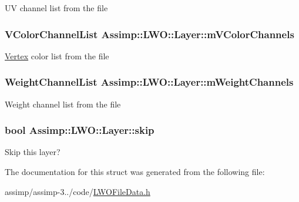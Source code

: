 U\+V channel list from the file \hypertarget{struct_assimp_1_1_l_w_o_1_1_layer_a641f7d01eea957b1f4fa9e272ae95679}{
\subsubsection[{m\+V\+Color\+Channels}]{\setlength{\rightskip}{0pt plus 5cm}V\+Color\+Channel\+List Assimp\+::\+L\+W\+O\+::\+Layer\+::m\+V\+Color\+Channels}}\label{struct_assimp_1_1_l_w_o_1_1_layer_a641f7d01eea957b1f4fa9e272ae95679}
\hyperlink{class_assimp_1_1_vertex}{Vertex} color list from the file \hypertarget{struct_assimp_1_1_l_w_o_1_1_layer_ab23b1fad6b5684399a082c6ffce1eee8}{
\subsubsection[{m\+Weight\+Channels}]{\setlength{\rightskip}{0pt plus 5cm}Weight\+Channel\+List Assimp\+::\+L\+W\+O\+::\+Layer\+::m\+Weight\+Channels}}\label{struct_assimp_1_1_l_w_o_1_1_layer_ab23b1fad6b5684399a082c6ffce1eee8}
Weight channel list from the file \hypertarget{struct_assimp_1_1_l_w_o_1_1_layer_af9375f0d0329e8c45492eba00d2d4443}{
\subsubsection[{skip}]{\setlength{\rightskip}{0pt plus 5cm}bool Assimp\+::\+L\+W\+O\+::\+Layer\+::skip}}\label{struct_assimp_1_1_l_w_o_1_1_layer_af9375f0d0329e8c45492eba00d2d4443}
Skip this layer? 

The documentation for this struct was generated from the following file\+:\begin{DoxyCompactItemize}
\item 
assimp/assimp-\/3../code/\hyperlink{_l_w_o_file_data_8h}{L\+W\+O\+File\+Data.\+h}\end{DoxyCompactItemize}
